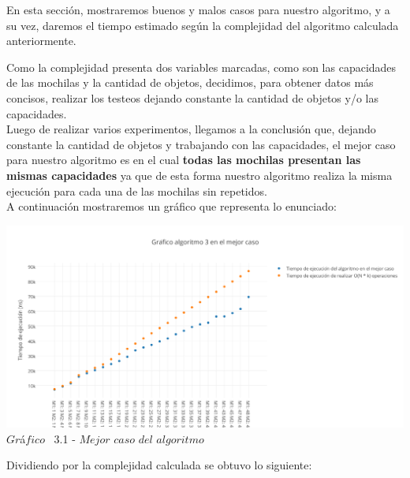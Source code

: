 \indent En esta secci\'on, mostraremos buenos y malos casos para nuestro algoritmo, y a su vez, daremos el tiempo estimado 
seg\'un la complejidad del algoritmo calculada anteriormente.

Como la complejidad presenta dos variables marcadas, como son las capacidades de las mochilas y la cantidad de objetos, decidimos, para obtener datos m\'as concisos, realizar los testeos dejando constante la cantidad de objetos y/o las capacidades.\\

Luego de realizar varios experimentos, llegamos a la conclusi\'on que, dejando constante la cantidad de objetos y trabajando con las capacidades, el mejor caso para nuestro algoritmo es en el cual \textbf{todas las mochilas presentan las mismas capacidades} ya que de esta forma nuestro algoritmo realiza la misma ejecuci\'on para cada una de las mochilas sin repetidos.\\
A continuaci\'on mostraremos un gr\'afico que representa lo enunciado:

\vspace*{0.3cm} \vspace*{0.3cm}
  \begin{center}
 \includegraphics[scale=0.65]{./EJ3/mejorcaso.png}
 {$Gr$\'a$fico$ \ 3.1 - $Mejor$ $caso$ $del$ $algoritmo$}
  \end{center}
  \vspace*{0.3cm}

Dividiendo por la complejidad calculada se obtuvo lo siguiente:\\

